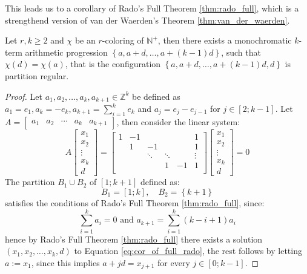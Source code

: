 This leads us to a corollary of Rado's Full Theorem \ref{thm:rado_full}, which is a strengthend version of van der Waerden's Theorem \ref{thm:van_der_waerden}.
\begin{corollary}
	Let $r, k \geq 2$ and $\chi$ be an $r$-coloring of $\mathbb{N}^{+}$, then there exists a monochromatic $k$-term arithmetic progression $\left\{a, a + d, \ldots, a + (k - 1)d\right\}$, such that $\chi(d) = \chi(a)$, that is the configuration $\left\{a, a + d, \ldots, a + (k - 1)d, d\right\}$ is partition regular.
\end{corollary}
\begin{proof}
	Let $a_1, a_2, \ldots, a_k, a_{k + 1} \in \mathbb{Z}^{k}$ be defined as $a_1 = e_{1}, a_k = - e_{k}, a_{k + 1} = \sum_{i = 1}^{k} e_{k}$ and $a_j = e_{j} - e_{j - 1}$ for $j \in [2; k - 1]$. Let $A = \begin{bmatrix} a_1 & a_2 & \cdots & a_k & a_{k + 1} \end{bmatrix}$, then consider the linear system:
	\begin{equation}\label{eq:cor_of_full_rado}
		A \begin{bmatrix} x_1 \\ x_{2} \\ \vdots \\ x_k \\ d \end{bmatrix}= \begin{bmatrix}
			1 & -1 &        &        &    & 1      \\
			  & 1  & -1     &        &    & 1      \\
			  &    & \ddots & \ddots &    & \vdots \\
			  &    &        & 1      & -1 & 1      \\
		\end{bmatrix}
		\begin{bmatrix} x_1 \\ x_2 \\ \vdots \\ x_{k} \\ d \end{bmatrix} = 0
	\end{equation}
	The partition $B_1 \cup B_2$ of $[1; k + 1]$ defined as:
	\begin{equation*}
		B_1 = [1; k], \quad B_2 = \left\{k + 1\right\}
	\end{equation*}
	satisfies the conditions of Rado's Full Theorem \ref{thm:rado_full}, since:
	\begin{equation*}
		\sum_{i = 1}^k a_i = 0 \text{ and } a_{k + 1} = \sum_{i = 1}^{k} (k - i + 1) a_{i}
	\end{equation*}
	hence by Rado's Full Theorem \ref{thm:rado_full} there exists a solution $(x_1, x_2, \ldots, x_k, d)$ to Equation \eqref{eq:cor_of_full_rado}, the rest follows by letting $a := x_{1}$, since this implies $a + jd = x_{j + 1}$ for every $j \in [0; k -1]$.
\end{proof}
